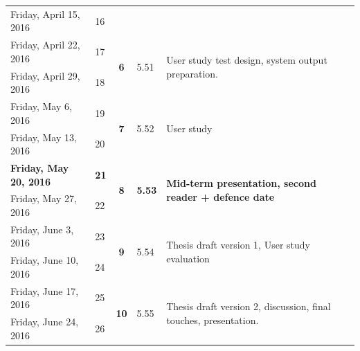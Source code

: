 \documentclass{../resources/acm_proc_article-sp}
\begin{document}
\begin{table}[]
{\begin{tabular}{llcll}
Friday, April 15, 2016        & 16            &                              &                                &                                                                                                   \\
Friday, April 22, 2016        & 17            & \multirow{2}{*}{\textbf{6}}  & \multirow{2}{*}{5.51}          & \multirow{2}{*}{User study test design, system output preparation.}                               \\
Friday, April 29, 2016        & 18            &                              &                                &                                                                                                   \\
Friday, May 6, 2016           & 19            & \multirow{2}{*}{\textbf{7}}  & \multirow{2}{*}{5.52}          & \multirow{2}{*}{User study}                                                                       \\
Friday, May 13, 2016          & 20            &                              &                                &                                                                                                   \\
\textbf{Friday, May 20, 2016} & \textbf{21}   & \multirow{2}{*}{\textbf{8}}  & \multirow{2}{*}{\textbf{5.53}} & \multirow{2}{*}{\textbf{Mid-term presentation, second reader + defence date}}                     \\
Friday, May 27, 2016          & 22            &                              &                                &                                                                                                   \\
Friday, June 3, 2016          & 23            & \multirow{2}{*}{\textbf{9}}  & \multirow{2}{*}{5.54}          & \multirow{2}{*}{Thesis draft version 1, User study evaluation}                                    \\
Friday, June 10, 2016         & 24            &                              &                                &                                                                                                   \\
Friday, June 17, 2016         & 25            & \multirow{2}{*}{\textbf{10}} & \multirow{2}{*}{5.55}          & \multirow{2}{*}{Thesis draft version 2, discussion, final touches, presentation.}                 \\
Friday, June 24, 2016         & 26            &                              &                                &                                                                                                   \\

\end{tabular}}
\end{table}
\end{document}
